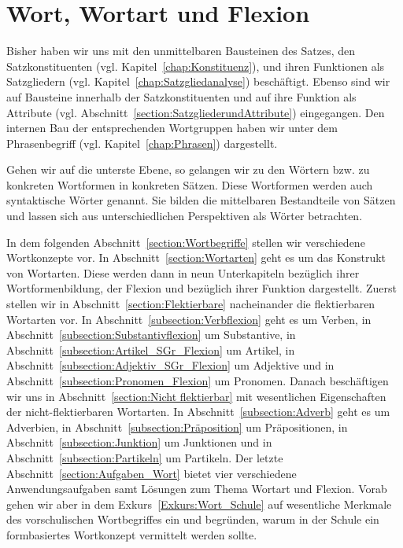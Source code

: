 \chapter{Wort, Wortart und Flexion}\label{chapter:Wort}

Bisher haben wir uns mit den unmittelbaren Bausteinen des Satzes, den Satzkonstituenten (vgl. Kapitel~\ref{chap:Konstituenz}), und ihren Funktionen als Satzgliedern (vgl. Kapitel~\ref{chap:Satzgliedanalyse}) beschäftigt. Ebenso sind wir auf Bausteine innerhalb der Satzkonstituenten und auf ihre Funktion als Attribute (vgl. Abschnitt~\ref{section:SatzgliederundAttribute}) eingegangen. Den internen Bau der entsprechenden Wortgruppen haben wir unter dem Phrasenbegriff (vgl. Kapitel~\ref{chap:Phrasen}) dargestellt. 

Gehen wir auf die unterste Ebene, so gelangen wir zu den Wörtern bzw. zu konkreten Wortformen in konkreten Sätzen. Diese Wortformen werden auch syntaktische Wörter genannt. Sie bilden die mittelbaren Bestandteile von Sätzen und lassen sich aus unterschiedlichen Perspektiven als Wörter betrachten.

In dem folgenden Abschnitt~\ref{section:Wortbegriffe} stellen wir verschiedene Wortkonzepte vor. In Abschnitt~\ref{section:Wortarten} geht es um das Konstrukt von Wortarten. Diese werden dann in neun Unterkapiteln bezüglich ihrer Wortformenbildung, der Flexion und bezüglich ihrer Funktion dargestellt. Zuerst stellen wir in Abschnitt~\ref{section:Flektierbare} nacheinander die flektierbaren Wortarten vor. In Abschnitt~\ref{subsection:Verbflexion} geht es um Verben, in Abschnitt~\ref{subsection:Substantivflexion} um Substantive, in Abschnitt~\ref{subsection:Artikel_SGr_Flexion} um Artikel, in Abschnitt~\ref{subsection:Adjektiv_SGr_Flexion} um Adjektive und in Abschnitt~\ref{subsection:Pronomen_Flexion} um Pronomen. Danach beschäftigen wir uns in Abschnitt~\ref{section:Nicht flektierbar} mit wesentlichen Eigenschaften der nicht-flektierbaren Wortarten. In Abschnitt~\ref{subsection:Adverb} geht es um Adverbien, in Abschnitt~\ref{subsection:Präposition} um Präpositionen, in Abschnitt~\ref{subsection:Junktion} um Junktionen und in Abschnitt~\ref{subsection:Partikeln} um Partikeln. Der letzte Abschnitt~\ref{section:Aufgaben_Wort} bietet vier verschiedene Anwendungsaufgaben samt Lösungen zum Thema Wortart und Flexion. Vorab gehen wir aber in dem Exkurs~\ref{Exkurs:Wort_Schule} auf wesentliche Merkmale des vorschulischen Wortbegriffes ein und begründen, warum in der Schule ein formbasiertes Wortkonzept vermittelt werden sollte.


